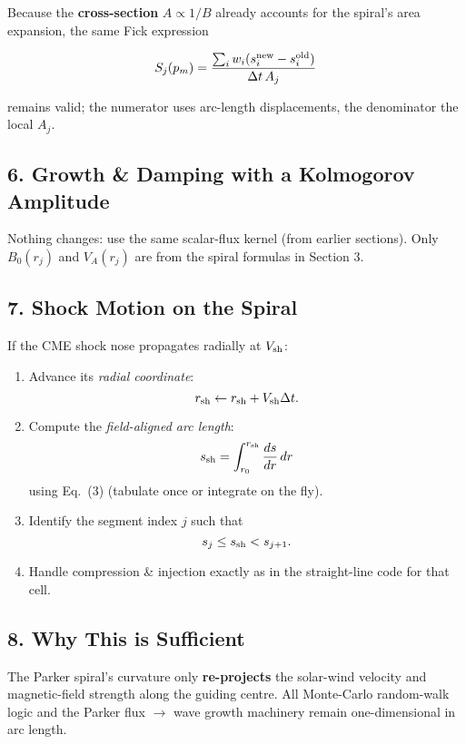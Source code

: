 Because the \textbf{cross-section} $A \propto 1/B$ already accounts for the spiral’s area expansion, the same Fick expression

\[
S_j(p_m) = \frac{ \sum_i w_i (s_i^{\rm new} - s_i^{\rm old}) }
                { \Delta t\, A_j }
\]

remains valid; the numerator uses arc-length displacements, the denominator the local $A_j$.

\subsection*{6. Growth \& Damping with a Kolmogorov Amplitude}

Nothing changes: use the same scalar-flux kernel (from earlier sections).
Only $B_0(r_j)$ and $V_A(r_j)$ are from the spiral formulas in Section 3.

\subsection*{7. Shock Motion on the Spiral}

If the CME shock nose propagates radially at $V_{\rm sh}$:

\begin{enumerate}
    \item Advance its \textit{radial coordinate}:
    \[
    r_{\rm sh} \leftarrow r_{\rm sh} + V_{\rm sh} \Delta t.
    \]
    \item Compute the \textit{field-aligned arc length}:
    \[
    s_{\rm sh} = \int_{r_0}^{r_{\rm sh}} \frac{ds}{dr} \, dr
    \]
    using Eq.~(3) (tabulate once or integrate on the fly).
    \item Identify the segment index $j$ such that
    \[
    s_j \leq s_{\rm sh} < s_{j+1}.
    \]
    \item Handle compression \& injection exactly as in the straight-line code for that cell.
\end{enumerate}

\subsection*{8. Why This is Sufficient}

The Parker spiral’s curvature only \textbf{re-projects} the solar-wind velocity and magnetic-field strength along the guiding centre.
All Monte-Carlo random-walk logic and the Parker flux $\rightarrow$ wave growth machinery remain one-dimensional in arc length.

